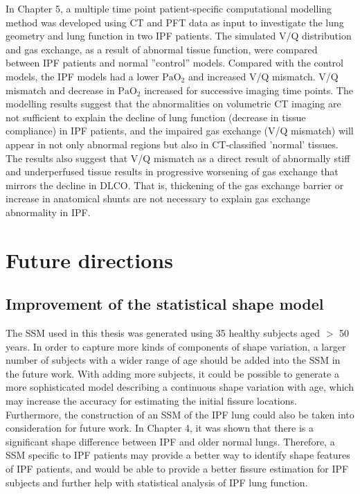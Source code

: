 \noindent In Chapter 5, a multiple time point patient-specific computational modelling method was developed using CT and PFT data as input to investigate the lung geometry and lung function in two IPF patients. The simulated V/Q distribution and gas exchange, as a result of abnormal tissue function, were compared between IPF patients and normal ''control'' models. Compared with the control models, the IPF models had a lower $\mathrm{PaO_2}$ and increased V/Q mismatch. V/Q mismatch and decrease in $\mathrm{PaO_2}$ increased for successive imaging time points. The modelling results suggest that the abnormalities on volumetric CT imaging are not sufficient to explain the decline of lung function (decrease in tissue compliance) in IPF patients, and the impaired gas exchange (V/Q mismatch) will appear in not only abnormal regions but also in CT-classified 'normal' tissues. The results also suggest that V/Q mismatch as a direct result of abnormally stiff and underperfused tissue results in progressive worsening of gas exchange that mirrors the decline in DLCO. That is, thickening of the gas exchange barrier or increase in anatomical shunts are not necessary to explain gas exchange abnormality in IPF.

\section{Future directions}\label{FutureDirection}
\subsection{Improvement of the statistical shape model}
The SSM used in this thesis was generated using 35 healthy subjects aged $>$ 50 years. In order to capture more kinds of components of shape variation, a larger number of subjects with a wider range of age should be added into the SSM in the future work. With adding more subjects, it could be possible to generate a more sophisticated model describing a continuous shape variation with age, which may increase the accuracy for estimating the initial fissure locations. Furthermore, the construction of an SSM of the IPF lung could also be taken into consideration for future work. In Chapter 4, it was shown that there is a significant shape difference between IPF and older normal lungs. Therefore, a SSM specific to IPF patients may provide a better way to identify shape features of IPF patients, and would be able to provide a better fissure estimation for IPF subjects and further help with statistical analysis of IPF lung function. 

